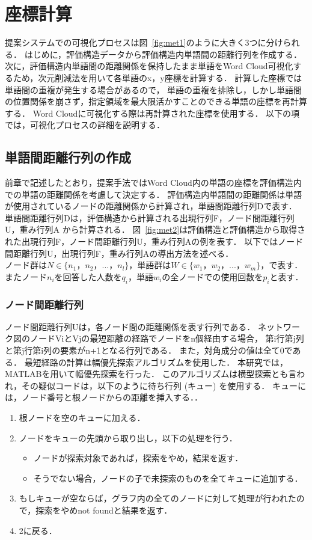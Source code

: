 \documentclass[syuuron]{kuee}
\begin{document}
	\section{座標計算}
		提案システムでの可視化プロセスは図~\ref{fig:met1}のように大きく3つに分けられる．
		はじめに，評価構造データから評価構造内単語間の距離行列を作成する．
		次に，評価構造内単語間の距離関係を保持したまま単語をWord Cloud可視化するため，次元削減法を用いて各単語のx，y座標を計算する．
		計算した座標では単語間の重複が発生する場合があるので，
		単語の重複を排除し，しかし単語間の位置関係を崩さず，指定領域を最大限活かすことのできる単語の座標を再計算する．
		Word Cloudに可視化する際は再計算された座標を使用する．
		以下の項では，可視化プロセスの詳細を説明する．
		
		\subsection{単語間距離行列の作成}
			前章で記述したとおり，提案手法ではWord Cloud内の単語の座標を評価構造内での単語の距離関係を考慮して決定する．
			評価構造内単語間の距離関係は単語が使用されているノードの距離関係から計算され，単語間距離行列Dで表す．
			単語間距離行列Dは，評価構造から計算される出現行列F，ノード間距離行列U，重み行列A から計算される．
			図~\ref{fig:met2}は評価構造と評価構造から取得された出現行列F，ノード間距離行列U，重み行列Aの例を表す．
			以下ではノード間距離行列U，出現行列F，重み行列Aの導出方法を述べる．
			$ノード群はN \in \bigl\{n_{1}，n_{2}，...，n_{l} \bigl\}，単語群はW \in \bigl\{w_{1}，w_{2}，...，w_{m} \bigl\}，で表す．$
			$またノードn_iを回答した人数をq_i，単語w_iの全ノードでの使用回数をp_iと表す．$
			
			\subsubsection{ノード間距離行列}
				ノード間距離行列Uは，各ノード間の距離関係を表す行列である．
				ネットワーク図のノードViとVjの最短距離の経路でノードをn個経由する場合，
				第i行第j列と第j行第i列の要素がn+1となる行列である．
				また，対角成分の値は全て0である．
				最短経路の計算は幅優先探索アルゴリズムを使用した．
				本研究では，MATLABを用いて幅優先探索を行った\cite{int1}．
				このアルゴリズムは横型探索とも言われ，その疑似コードは，以下のように待ち行列 (キュー) を使用する．
				キューには，ノード番号と根ノードからの距離を挿入する．．
				
				\begin{enumerate}
					\item 根ノードを空のキューに加える．
					\item ノードをキューの先頭から取り出し，以下の処理を行う．
						\begin{itemize}
							\item ノードが探索対象であれば，探索をやめ，結果を返す．
							\item そうでない場合，ノードの子で未探索のものを全てキューに追加する．
						\end{itemize}
					\item もしキューが空ならば，グラフ内の全てのノードに対して処理が行われたので，探索をやめnot foundと結果を返す．
					\item 2に戻る．
				\end{enumerate}
				
\end{document}
